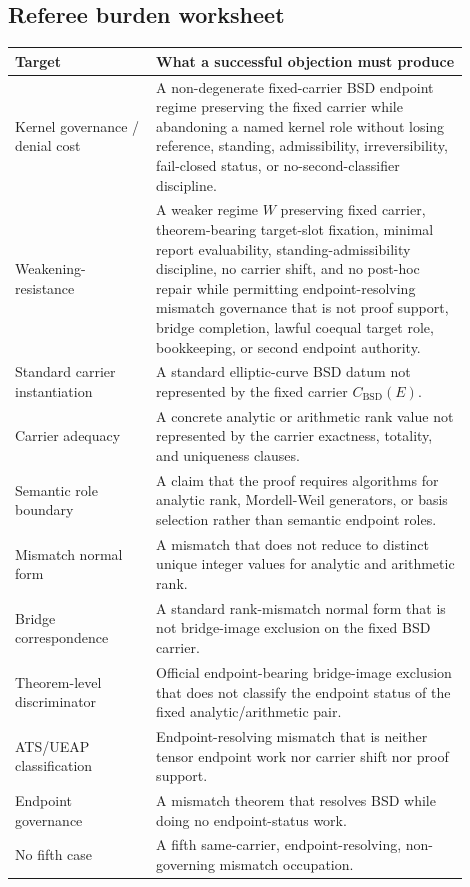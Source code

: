 \documentclass[11pt]{article}
\newcommand{\BSD}{\mathrm{BSD}}
\begin{document}
\subsection{Referee burden worksheet}
\begin{longtable}{L{0.28\linewidth}L{0.62\linewidth}}
\toprule
\textbf{Target} & \textbf{What a successful objection must produce}\\
\midrule
Kernel governance / denial cost & A non-degenerate fixed-carrier BSD endpoint regime preserving the fixed carrier while abandoning a named kernel role without losing reference, standing, admissibility, irreversibility, fail-closed status, or no-second-classifier discipline.\\
Weakening-resistance & A weaker regime $W$ preserving fixed carrier, theorem-bearing target-slot fixation, minimal report evaluability, standing-admissibility discipline, no carrier shift, and no post-hoc repair while permitting endpoint-resolving mismatch governance that is not proof support, bridge completion, lawful coequal target role, bookkeeping, or second endpoint authority.\\
Standard carrier instantiation & A standard elliptic-curve BSD datum not represented by the fixed carrier $C_{\BSD}(E)$.\\
Carrier adequacy & A concrete analytic or arithmetic rank value not represented by the carrier exactness, totality, and uniqueness clauses.\\
Semantic role boundary & A claim that the proof requires algorithms for analytic rank, Mordell-Weil generators, or basis selection rather than semantic endpoint roles.\\
Mismatch normal form & A mismatch that does not reduce to distinct unique integer values for analytic and arithmetic rank.\\
Bridge correspondence & A standard rank-mismatch normal form that is not bridge-image exclusion on the fixed BSD carrier.\\
Theorem-level discriminator & Official endpoint-bearing bridge-image exclusion that does not classify the endpoint status of the fixed analytic/arithmetic pair.\\
ATS/UEAP classification & Endpoint-resolving mismatch that is neither tensor endpoint work nor carrier shift nor proof support.\\
Endpoint governance & A mismatch theorem that resolves BSD while doing no endpoint-status work.\\
No fifth case & A fifth same-carrier, endpoint-resolving, non-governing mismatch occupation.\\

\end{longtable}
\end{document}
